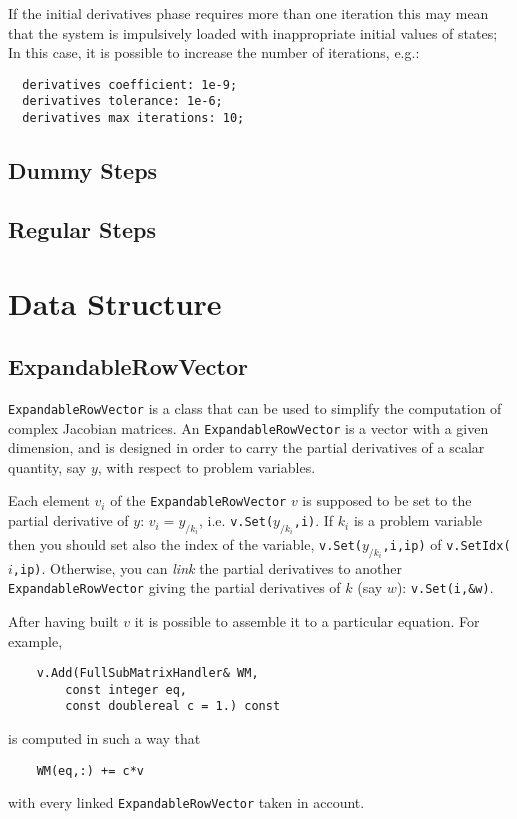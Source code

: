 \documentclass[10pt,dvips,fleqn,subeqn]{report}
\begin{document}
\noindent
If the initial derivatives phase requires
more than one iteration  
this may mean that
the system is impulsively loaded  with inappropriate 
initial values of states; 
In this case, it is possible to increase the number of iterations, e.g.:
\begin{verbatim}
  derivatives coefficient: 1e-9;
  derivatives tolerance: 1e-6;
  derivatives max iterations: 10; 
\end{verbatim}
\section{Dummy Steps}
\section{Regular Steps}

\chapter{Data Structure}
\section{ExpandableRowVector}
\texttt{ExpandableRowVector} is a class that can be used to
simplify the computation of complex Jacobian matrices.
An \texttt{ExpandableRowVector} is a vector with a given dimension,
and is designed in order to carry the partial derivatives
of a scalar quantity, say $y$, with respect to problem variables.

\noindent
Each element $v_i$ of the \texttt{ExpandableRowVector} $v$ 
is supposed to be set to the partial derivative
of $y$: $v_i = y_{/k_i}$, i.e. \texttt{v.Set($y_{/k_i}$,i)}.
If $k_i$ is a problem variable then you should set also
the index of the variable, \texttt{v.Set($y_{/k_i}$,i,ip)}
of \texttt{v.SetIdx($i$,ip)}. Otherwise, you can
\emph{link} the partial derivatives to another \texttt{ExpandableRowVector}
giving the partial derivatives of $k$ (say $w$): \texttt{v.Set(i,\&w)}.

\noindent
After having built $v$ it is possible to assemble it 
to a particular equation. For example,
\begin{verbatim}
    v.Add(FullSubMatrixHandler& WM,
        const integer eq,
        const doublereal c = 1.) const
\end{verbatim}
is computed in such a way that
\begin{verbatim}
    WM(eq,:) += c*v
\end{verbatim}
with every linked \texttt{ExpandableRowVector} taken in account.
\end{document}
